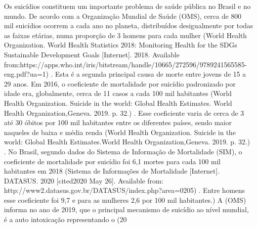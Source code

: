 Os suicídios constituem um importante problema de saúde pública no Brasil e no mundo. De acordo com a Organização Mundial de Saúde (OMS), cerca de 800 mil suicídios ocorrem a cada ano no planeta, distribuídos desigualmente por todas as faixas etárias, numa proporção de 3 homens para cada mulher (World Health Organization. World Health Statistics 2018: Monitoring Health for the SDGs Sustainable Development Goals [Internet]. 2018. Available from:https://apps.who.int/iris/bitstream/handle/10665/272596/9789241565585-eng.pdf?ua=1) . Esta é a segunda principal causa de morte entre jovens de 15 a 29 anos. Em 2016, o coeficiente de mortalidade por suicídio padronizado por idade era, globalmente, cerca de 11 casos a cada 100 mil habitantes (World Health Organization. Suicide in the world: Global Health Estimates. World Health Organization,Geneva. 2019. p. 32.) . Esse coeficiente varia de cerca de 3 até 30 óbitos por 100 mil habitantes entre os diferentes países, sendo maior naqueles de baixa e média renda (World Health Organization. Suicide in the world: Global Health Estimates.World Health Organization,Geneva. 2019. p. 32.) . No Brasil, segundo dados do Sistema de Informação de Mortalidade (SIM), o coeficiente de mortalidade por suicídio foi 6,1 mortes para cada 100 mil habitantes em 2018 (Sistema de Informações de Mortalidade [Internet]. DATASUS. 2020 [cited2020 May 26]. Available from: http://www2.datasus.gov.br/DATASUS/index.php?area=0205) . Entre homens esse coeficiente foi 9,7 e para as mulheres 2,6 por 100 mil habitantes.) 
A (OMS) informa no ano de 2019, que o principal mecanismo de suicídio ao nível mundial, é a auto intoxicação representando o (20%
